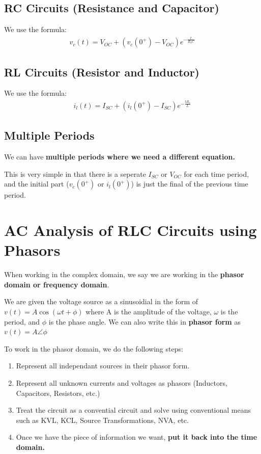 \documentclass[12pt,letterpaper]{article} \usepackage{amsmath} \usepackage{graphicx} \usepackage[margin=1in]{geometry} \usepackage{longtable}  \usepackage{amssymb}
\begin{document}
	\subsection{RC Circuits (Resistance and Capacitor)}
	We use the formula:
	\begin{align*}
		v_c(t)=V_{OC}+(v_c(0^+)-V_{OC})e^{-\frac{t}{R_tC}}
	\end{align*}
	
	\subsection{RL Circuits (Resistor and Inductor)}
	We use the formula:
	\begin{align*}
		i_l(t)=I_{SC}+(i_l(0^+)-I_{SC})e^{-\frac{tR_t}{L}}
	\end{align*}

	\subsection{Multiple Periods}
	We can have \textbf{multiple periods where we need a different equation.}
	
	This is very simple in that there is a seperate $I_{SC}$ or $V_{OC}$ for each time period, and the initial part ($v_c(0^+)$ or $i_l(0^+)$) is just the final of the previous time period. 
	
	\section{AC Analysis of RLC Circuits using Phasors}
	When working in the complex domain, we say we are working in the \textbf{phasor domain or frequency domain}. 
	
	We are given the voltage source as a sinusoidial in the form of $v(t)=A\cos(\omega t+\phi)$ where A is the amplitude of the voltage, $\omega$ is the period, and $\phi$ is the phase angle. We can also write this in \textbf{phasor form} as $v(t)=A\angle \phi$
	
	To work in the phasor domain, we do the following steps:
	\begin{enumerate}[noitemsep]
		\item Represent all independant sources in their phasor form.
		\item Represent all unknown currents and voltages as phasors (Inductors, Capacitors, Resistors, etc.)
		\item Treat the circuit as a convential circuit and solve using conventional means such as KVL, KCL, Source Transformations, NVA, etc. 
		\item Once we have the piece of information we want, \textbf{put it back into the time domain.}
	\end{enumerate}
\end{document}
